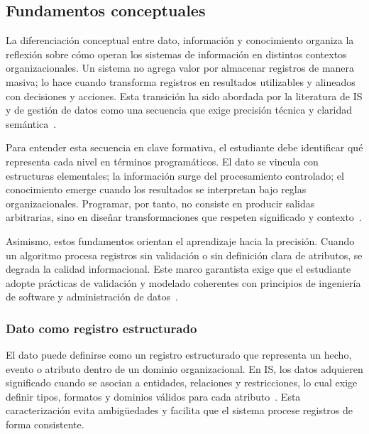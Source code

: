 \documentclass[12pt,twoside]{book}
\begin{document}
				\subsection{Fundamentos conceptuales}
					\noindent
					La diferenciación conceptual entre dato, información y conocimiento organiza la reflexión sobre cómo operan los sistemas de información en distintos contextos organizacionales. Un sistema no agrega valor por almacenar registros de manera masiva; lo hace cuando transforma registros en resultados utilizables y alineados con decisiones y acciones. Esta transición ha sido abordada por la literatura de IS y de gestión de datos como una secuencia que exige precisión técnica y claridad semántica~\cite{Laudon2020Management,Bernstein2009Data,Calzati2025Ecosystemic}.
					
					Para entender esta secuencia en clave formativa, el estudiante debe identificar qué representa cada nivel en términos programáticos. El dato se vincula con estructuras elementales; la información surge del procesamiento controlado; el conocimiento emerge cuando los resultados se interpretan bajo reglas organizacionales. Programar, por tanto, no consiste en producir salidas arbitrarias, sino en diseñar transformaciones que respeten significado y contexto~\cite{Kendall2014Systems,Date2019Database,Hanly2015Problem}.
					
					Asimismo, estos fundamentos orientan el aprendizaje hacia la precisión. Cuando un algoritmo procesa registros sin validación o sin definición clara de atributos, se degrada la calidad informacional. Este marco garantista exige que el estudiante adopte prácticas de validación y modelado coherentes con principios de ingeniería de software y administración de datos~\cite{Ghezzi2003Fundamentals,Sommerville2015Software,Elmasri2016Database}.
						
					\subsubsection{Dato como registro estructurado}
						\noindent
						El dato puede definirse como un registro estructurado que representa un hecho, evento o atributo dentro de un dominio organizacional. En IS, los datos adquieren significado cuando se asocian a entidades, relaciones y restricciones, lo cual exige definir tipos, formatos y dominios válidos para cada atributo~\cite{Laudon2020Management,Date2019Database,Elmasri2016Database}. Esta caracterización evita ambigüedades y facilita que el sistema procese registros de forma consistente.
						
\end{document}
